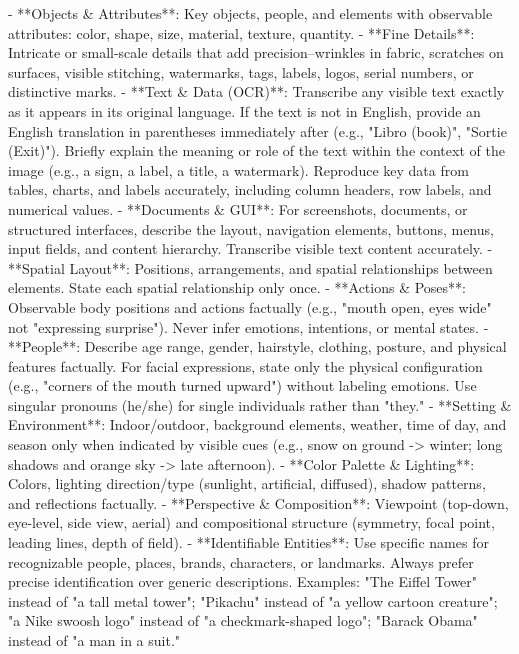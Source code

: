 \begin{tcblisting}
- **Objects & Attributes**: Key objects, people, and elements with observable attributes: color, shape, size, material, texture, quantity.
- **Fine Details**: Intricate or small-scale details that add precision--wrinkles in fabric, scratches on surfaces, visible stitching, watermarks, tags, labels, logos, serial numbers, or distinctive marks.
- **Text & Data (OCR)**: Transcribe any visible text exactly as it appears in its original language. If the text is not in English, provide an English translation in parentheses immediately after (e.g., "Libro (book)", "Sortie (Exit)"). Briefly explain the meaning or role of the text within the context of the image (e.g., a sign, a label, a title, a watermark). Reproduce key data from tables, charts, and labels accurately, including column headers, row labels, and numerical values.
- **Documents & GUI**: For screenshots, documents, or structured interfaces, describe the layout, navigation elements, buttons, menus, input fields, and content hierarchy. Transcribe visible text content accurately.
- **Spatial Layout**: Positions, arrangements, and spatial relationships between elements. State each spatial relationship only once.
- **Actions & Poses**: Observable body positions and actions factually (e.g., "mouth open, eyes wide" not "expressing surprise"). Never infer emotions, intentions, or mental states.
- **People**: Describe age range, gender, hairstyle, clothing, posture, and physical features factually. For facial expressions, state only the physical configuration (e.g., "corners of the mouth turned upward") without labeling emotions. Use singular pronouns (he/she) for single individuals rather than "they."
- **Setting & Environment**: Indoor/outdoor, background elements, weather, time of day, and season only when indicated by visible cues (e.g., snow on ground -> winter; long shadows and orange sky -> late afternoon).
- **Color Palette & Lighting**: Colors, lighting direction/type (sunlight, artificial, diffused), shadow patterns, and reflections factually.
- **Perspective & Composition**: Viewpoint (top-down, eye-level, side view, aerial) and compositional structure (symmetry, focal point, leading lines, depth of field).
- **Identifiable Entities**: Use specific names for recognizable people, places, brands, characters, or landmarks. Always prefer precise identification over generic descriptions.
  Examples: "The Eiffel Tower" instead of "a tall metal tower"; "Pikachu" instead of "a yellow cartoon creature"; "a Nike swoosh logo" instead of "a checkmark-shaped logo"; "Barack Obama" instead of "a man in a suit."

\end{tcblisting}
